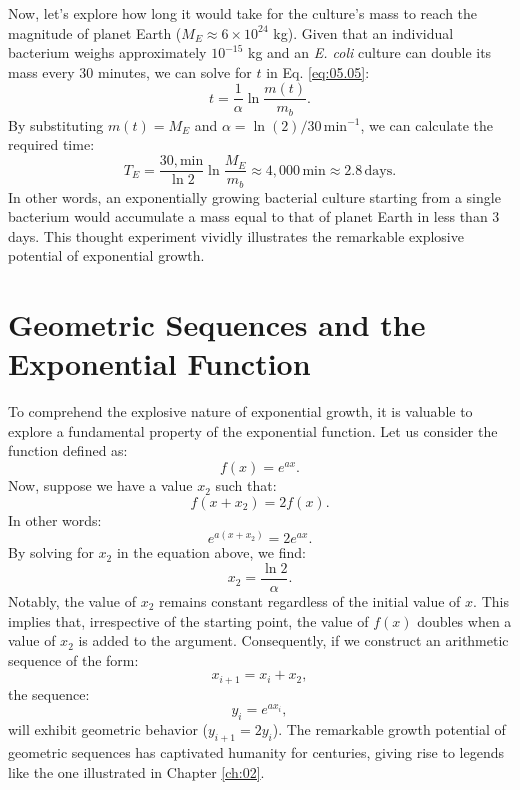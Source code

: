Now, let's explore how long it would take for the culture's mass to reach the magnitude of planet Earth ($M_E \approx 6 \times 10^{24}$ kg). Given that an individual bacterium weighs approximately $10^{-15}$ kg and an \textit{E. coli} culture can double its mass every 30 minutes, we can solve for $t$ in Eq. \eqref{eq:05.05}:
\begin{equation*}
t = \frac{1}{\alpha} \ln{\frac{m(t)}{m_b}}.
\end{equation*}
By substituting $m(t) = M_E$ and $\alpha = \ln(2) / 30 \, \text{min}^{-1}$, we can calculate the required time:
\begin{equation*}
T_E = \frac{30 , \text{min}}{\ln{2}} \ln{\frac{M_E}{m_b}} \approx 4,000 \, \text{min} \approx 2.8 \, \text{days}.
\end{equation*}
In other words, an exponentially growing bacterial culture starting from a single bacterium would accumulate a mass equal to that of planet Earth in less than 3 days. This thought experiment vividly illustrates the remarkable explosive potential of exponential growth.

\section{Geometric Sequences and the Exponential Function}

To comprehend the explosive nature of exponential growth, it is valuable to explore a fundamental property of the exponential function. Let us consider the function defined as:
\begin{equation*}
f(x) = e^{a x}.
\end{equation*}
Now, suppose we have a value $x_2$ such that:
\begin{equation*}
f(x + x_2) = 2 f(x).
\end{equation*}
In other words:
\begin{equation*}
e^{a (x + x_2)} = 2 e^{a x}.
\end{equation*}
By solving for $x_2$ in the equation above, we find:
\begin{equation*}
x_2 = \frac{\ln{2}}{\alpha}.
\end{equation*}
Notably, the value of $x_2$ remains constant regardless of the initial value of $x$. This implies that, irrespective of the starting point, the value of $f(x)$ doubles when a value of $x_2$ is added to the argument. Consequently, if we construct an arithmetic sequence of the form:
\begin{equation*}
x_{i+1} = x_i + x_2,
\end{equation*}
the sequence:
\begin{equation*}
y_i = e^{a x_i},
\end{equation*}
will exhibit geometric behavior ($y_{i+1} = 2 y_i$). The remarkable growth potential of geometric sequences has captivated humanity for centuries, giving rise to legends like the one illustrated in Chapter \ref{ch:02}.


